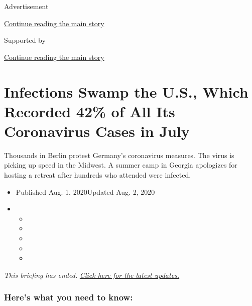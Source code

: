 Advertisement

\protect\hyperlink{after-top}{Continue reading the main story}

Supported by

\protect\hyperlink{after-sponsor}{Continue reading the main story}

\hypertarget{infections-swamp-the-us-which-recorded-42-of-all-its-coronavirus-cases-in-july}{%
\section{Infections Swamp the U.S., Which Recorded 42\% of All Its
Coronavirus Cases in
July}\label{infections-swamp-the-us-which-recorded-42-of-all-its-coronavirus-cases-in-july}}

Thousands in Berlin protest Germany's coronavirus measures. The virus is
picking up speed in the Midwest. A summer camp in Georgia apologizes for
hosting a retreat after hundreds who attended were infected.

\begin{itemize}
\item
  Published Aug. 1, 2020Updated Aug. 2, 2020
\item
  \begin{itemize}
  \item
  \item
  \item
  \item
  \item
  \end{itemize}
\end{itemize}

\emph{This briefing has ended.}
\href{https://www.nytimes3xbfgragh.onion/2020/08/02/world/coronavirus-updates.html}{\emph{Click
here for the latest updates.}}

\hypertarget{heres-what-you-need-to-know}{%
\subsubsection{Here's what you need to
know:}\label{heres-what-you-need-to-know}}

